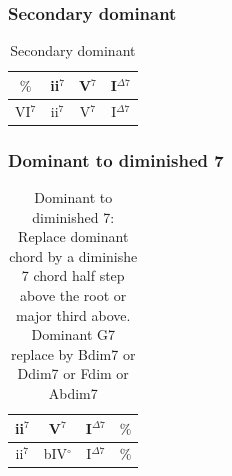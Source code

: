 \documentclass{article}
\begin{document}
\subsubsection{Secondary dominant}
\begin{table}[!h]
	\caption{Secondary dominant}
	\centering
	\begin{tabular}{| c | c | c | c |}
		\hline
		 \phantom{x}$\%$\phantom{x} & \phantom{x}ii$^7$\phantom{x} & \phantom{x}V$^7$\phantom{x} & \phantom{x}I$^{\Delta 7}$\phantom{x}   \\
		\hline
		\phantom{x}VI$^7$\phantom{x} & \phantom{x}ii$^7$\phantom{x} &  \phantom{x}V$^{7}$\phantom{x}  & \phantom{x}I$^{\Delta 7}$\phantom{x} \\
		\hline
	\end{tabular}
	\label{tab: }
\end{table}

\subsubsection{Dominant to diminished 7}
\begin{table}[!h]
	\caption{Dominant to diminished 7: Replace dominant chord by a diminishe 7 chord half step above the root or major third above. Dominant G7 replace by Bdim7 or Ddim7 or Fdim or Abdim7}
	\centering
	\begin{tabular}{| c | c | c | c |}
		\hline
		\phantom{x}ii$^7$\phantom{x} & \phantom{x}V$^7$\phantom{x} & \phantom{x}I$^{\Delta 7}$\phantom{x}  & \phantom{x}$\%$\phantom{x} \\
		\hline
		\phantom{x}ii$^7$\phantom{x} & \phantom{x}bIV$^\circ$\phantom{x} & \phantom{x}I$^{\Delta 7}$\phantom{x}  & \phantom{x}$\%$\phantom{x} \\
		\hline
	\end{tabular}
	\label{tab:diminished }
\end{table}
\end{document}
